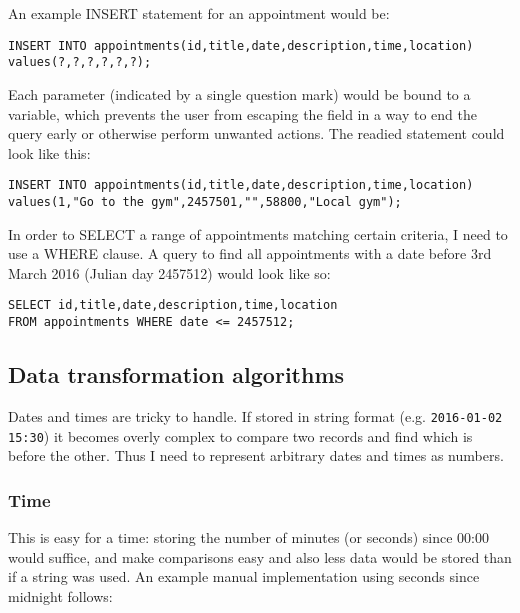 An example INSERT statement for an appointment would be:

\begin{verbatim}
INSERT INTO appointments(id,title,date,description,time,location)
values(?,?,?,?,?,?);
\end{verbatim}

Each parameter (indicated by a single question mark) would be bound to a
variable, which prevents the user from escaping the field in a way to end the
query early or otherwise perform unwanted actions. The readied statement could look like this:

\begin{verbatim}
INSERT INTO appointments(id,title,date,description,time,location)
values(1,"Go to the gym",2457501,"",58800,"Local gym");
\end{verbatim}

In order to SELECT a range of appointments matching certain criteria, I need to
use a WHERE clause. A query to find all appointments with a date before 3rd
March 2016 (Julian day 2457512) would look like so:

\begin{verbatim}
SELECT id,title,date,description,time,location
FROM appointments WHERE date <= 2457512;
\end{verbatim}



\subsection{Data transformation algorithms}

Dates and times are tricky to handle. If stored in string format (e.g.
\texttt{2016-01-02 15:30}) it becomes overly complex to compare two records and
find which is before the other. Thus I need to represent arbitrary dates and
times as numbers.


\subsubsection{Time}

This is easy for a time: storing the number of minutes (or seconds) since 00:00
would suffice, and make comparisons easy and also less data would be stored than
if a string was used. An example manual implementation using seconds
since midnight follows:

